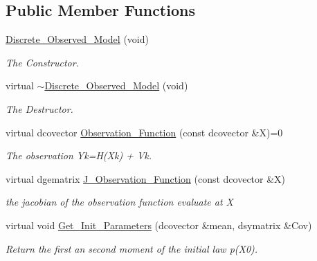 \subsection*{Public Member Functions}
\begin{CompactItemize}
\item 
\hyperlink{class_discrete___observed___model_919fa5f92fc705c4b2b3b7c94c0517ef}{Discrete\_\-Observed\_\-Model} (void)
\begin{CompactList}\small\item\em The Constructor. \item\end{CompactList}\item 
virtual \hyperlink{class_discrete___observed___model_8439d77622a8479eded60eeb51fcb5c6}{$\sim$Discrete\_\-Observed\_\-Model} (void)
\begin{CompactList}\small\item\em The Destructor. \item\end{CompactList}\item 
virtual dcovector \hyperlink{class_discrete___observed___model_8d56d86ea6b204672c8ebd720f1e11a6}{Observation\_\-Function} (const dcovector \&X)=0
\begin{CompactList}\small\item\em The observation Yk=H(Xk) + Vk. \item\end{CompactList}\item 
virtual dgematrix \hyperlink{class_discrete___observed___model_83cd1f2f54544d8977dbce844031f85e}{J\_\-Observation\_\-Function} (const dcovector \&X)
\begin{CompactList}\small\item\em the jacobian of the observation function evaluate at X \item\end{CompactList}\item 
virtual void \hyperlink{class_discrete___observed___model_e10c283d482bdb9257ad87a9cf5e6898}{Get\_\-Init\_\-Parameters} (dcovector \&mean, dsymatrix \&Cov)
\begin{CompactList}\small\item\em Return the first an second moment of the initial law p(X0). \item\end{CompactList}\end{CompactItemize}
